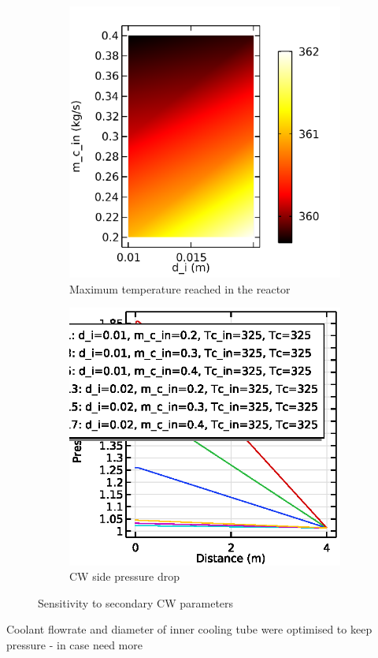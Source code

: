 \begin{figure}[h]
    \centering

    \begin{subfigure}{0.49\linewidth}
        \includegraphics[width=\linewidth]{figures/S2-maxT.png}
        \caption{Maximum temperature reached in the reactor}
        \label{fig:comsol-S2:maxT}
    \end{subfigure}
    \begin{subfigure}{0.49\linewidth}
        \includegraphics[width=\linewidth]{figures/S2-CW-Pdrop.eps}
        \caption{CW side pressure drop}
        \label{fig:comsol-S2:CW-Pdrop}
    \end{subfigure}

    \caption{Sensitivity to secondary CW parameters}
    \label{fig:comsol-S2}
\end{figure}
Coolant flowrate and diameter of inner cooling tube were optimised to keep pressure 
- in case need more


